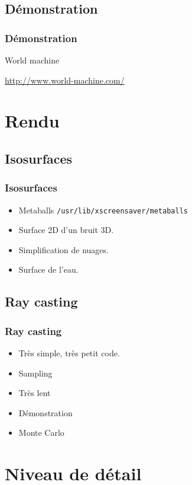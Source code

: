 \documentclass[hyperref={pdfpagelabels=false}]{beamer}
\begin{document}
\subsection{Démonstration}
\begin{frame}
  \frametitle{Démonstration}
  \begin{center}
  {\Huge World machine}
  
  \vspace{1em}
  \url{http://www.world-machine.com/}
  \end{center}
\end{frame}

\section{Rendu}

\subsection{Isosurfaces}
\begin{frame}
  \frametitle{Isosurfaces}
  \begin{itemize}
    \item Metaballs {\small \texttt{/usr/lib/xscreensaver/metaballs}}
    \item Surface 2D d'un bruit 3D.
    \item Simplification de nuages.
    \item Surface de l'eau.
  \end{itemize}
\end{frame}

\subsection{Ray casting}

\begin{frame}
  \frametitle{Ray casting}
  \begin{itemize}
  \item Très simple, très petit code.
  \item Sampling
  \item Très lent
  \item Démonstration
  \item Monte Carlo
  \end{itemize}
\end{frame}

\section[LOD]{Niveau de détail}
\end{document}
